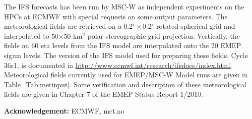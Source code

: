 The IFS forecasts has been run by MSC-W as
independent experiments on the HPCs at ECMWF with special requests on
some output parameters. The meteorological fields are retrieved on a
0.2$^{\circ}\times$0.2$^{\circ}$ rotated spherical grid and interpolated to
50$\times$50 km$^2$ polar-stereographic grid projection. Vertically, the fields
on 60 eta levels from the IFS model are interpolated onto the 20 EMEP sigma
levels. The version of the IFS model used for preparing these fields,
Cycle 36r1, is documented in \url{http://www.ecmwf.int/research/ifsdocs/index.html}.
Meteorological fields currently used for EMEP/MSC-W Model runs are given in
Table~\ref{Tab:metinput}. Some verification and description of these
meteorological fields are given in Chapter 7 of the EMEP Status Report
1/2010.

{\bf Acknowledgement:} ECMWF, met.no


